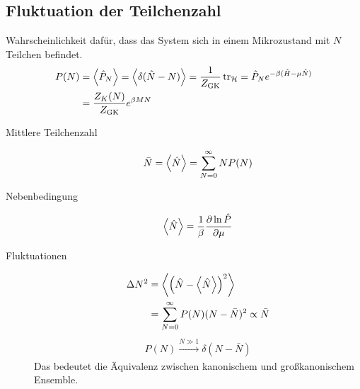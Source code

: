 \subsection*{Fluktuation der Teilchenzahl}
%
 Wahrscheinlichkeit daf\"ur, dass das System sich in einem Mikrozustand mit 
 $N$ Teilchen befindet.
\begin{align*}
    P(N)  & = 
     \Braket{\hat{P}_N} = \Braket{\delta (\hat{N} - N)} 
  = \frac{1}{Z_{\text{GK}}} \operatorname{tr}_{\mathcal{H}} = \hat{P}_N
  e ^{-\beta (\hat{H} - \mu \hat{N})} \\ & = 
  \frac{Z_K(N)}{Z_{\text{GK}}} e^{\beta M N}
\end{align*}
%
\begin{description}
  \item [Mittlere Teilchenzahl]
  \begin{align*}
    \bar{N} = \Braket{\hat{N}} = \sum_{N=0}^{\infty} N P(N)
  \end{align*}
\item[Nebenbedingung]
  \begin{align*}
    \Braket{\hat{N}} = \frac{1}{\beta} \frac{\partial \ln{\hat{P}} }{\partial \mu}
  \end{align*}
\item[Fluktuationen] 

  \begin{align*}
    \Delta N^2 & = \Braket{\left( \hat{N} - \Braket{\hat{N}} \right)^2} \\ 
               & = \sum_{N = 0 }^{\infty} P(N) (N - \bar{N})^2 \propto \bar{N}
  \end{align*}
  \begin{align*}
    P(N) \xrightarrow{N \gg 1} \delta (N - \bar{N})
  \end{align*}
  Das bedeutet die \"Aquivalenz zwischen kanonischem und gro\ss{}kanonischem
  Ensemble.
\end{description}

